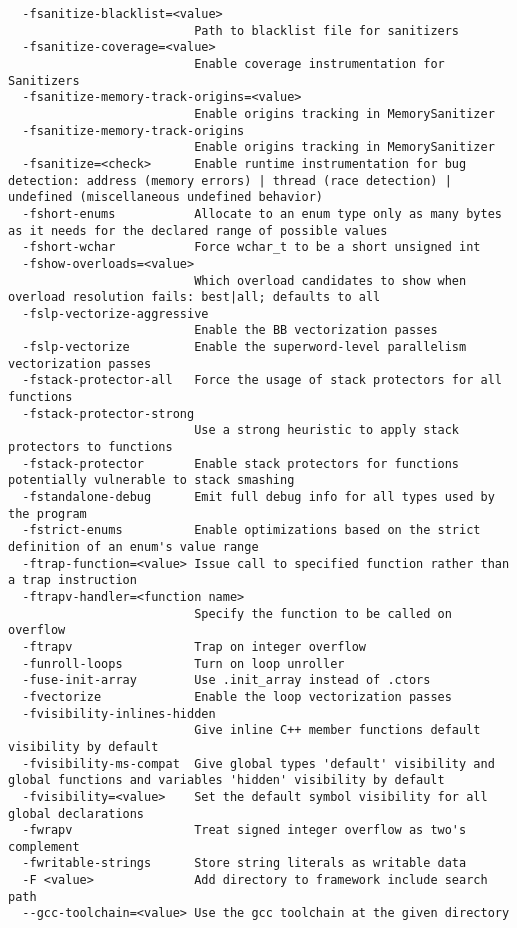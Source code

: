 \begin{verbatim}
  -fsanitize-blacklist=<value>
                          Path to blacklist file for sanitizers
  -fsanitize-coverage=<value>
                          Enable coverage instrumentation for Sanitizers
  -fsanitize-memory-track-origins=<value>
                          Enable origins tracking in MemorySanitizer
  -fsanitize-memory-track-origins
                          Enable origins tracking in MemorySanitizer
  -fsanitize=<check>      Enable runtime instrumentation for bug detection: address (memory errors) | thread (race detection) | undefined (miscellaneous undefined behavior)
  -fshort-enums           Allocate to an enum type only as many bytes as it needs for the declared range of possible values
  -fshort-wchar           Force wchar_t to be a short unsigned int
  -fshow-overloads=<value>
                          Which overload candidates to show when overload resolution fails: best|all; defaults to all
  -fslp-vectorize-aggressive
                          Enable the BB vectorization passes
  -fslp-vectorize         Enable the superword-level parallelism vectorization passes
  -fstack-protector-all   Force the usage of stack protectors for all functions
  -fstack-protector-strong
                          Use a strong heuristic to apply stack protectors to functions
  -fstack-protector       Enable stack protectors for functions potentially vulnerable to stack smashing
  -fstandalone-debug      Emit full debug info for all types used by the program
  -fstrict-enums          Enable optimizations based on the strict definition of an enum's value range
  -ftrap-function=<value> Issue call to specified function rather than a trap instruction
  -ftrapv-handler=<function name>
                          Specify the function to be called on overflow
  -ftrapv                 Trap on integer overflow
  -funroll-loops          Turn on loop unroller
  -fuse-init-array        Use .init_array instead of .ctors
  -fvectorize             Enable the loop vectorization passes
  -fvisibility-inlines-hidden
                          Give inline C++ member functions default visibility by default
  -fvisibility-ms-compat  Give global types 'default' visibility and global functions and variables 'hidden' visibility by default
  -fvisibility=<value>    Set the default symbol visibility for all global declarations
  -fwrapv                 Treat signed integer overflow as two's complement
  -fwritable-strings      Store string literals as writable data
  -F <value>              Add directory to framework include search path
  --gcc-toolchain=<value> Use the gcc toolchain at the given directory

\end{verbatim}
